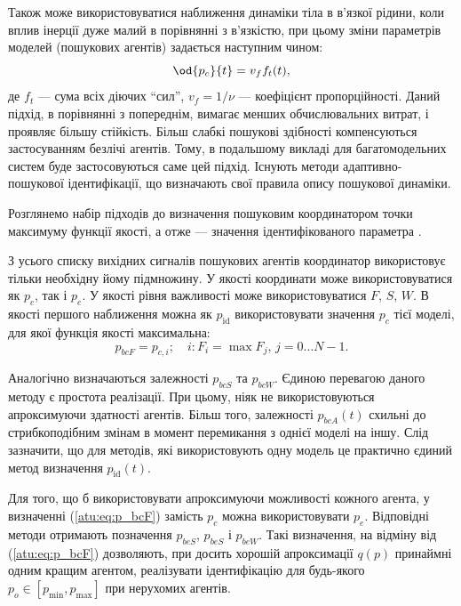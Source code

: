 \documentclass[a4paper,13pt]{atuaref}
\begin{document}
Також може використовуватися наближення динаміки тіла в в'язкої рідини, коли
вплив інерції дуже малий в порівнянні з в'язкістю, при цьому зміни параметрів
моделей (пошукових агентів) задається наступним чином:
%
\begin{equation}
  \od{p_c}{t} = v_f f_t(t),
  \label{atu:eq:v_f}
\end{equation}
%
\noindent
де $ f_t $ --- сума всіх діючих ``сил'',
$ v_f = 1 / \nu $ --- коефіцієнт
пропорційності. Даний підхід, в порівнянні з попереднім, вимагає менших
обчислювальних витрат, і проявляє більшу стійкість. Більш слабкі пошукові
здібності компенсуються застосуванням безлічі агентів. Тому, в подальшому
викладі для багатомодельних систем буде застосовуються саме цей підхід.
Існують методи адаптивно-пошукової ідентифікації, що визначають свої правила опису пошукової динаміки.


Розглянемо набір підходів до визначення пошуковим координатором точки максимуму
функції якості, а отже --- значення ідентифікованого параметра
\cite{atu_st99,atu_jacs2015}.

З усього списку вихідних сигналів пошукових агентів координатор використовує
тільки необхідну йому підмножину. У якості координати може використовуватися як
$ p_c$, так і $ p_e $.
У якості рівня важливості може використовуватися $ F $, $ S $, $W$.
В якості першого наближення можна як $ p_\mathrm{id} $ використовувати
значення $ p_c $ тієї моделі, для якої функція якості максимальна:
%
\begin{equation}
  p_{bcF}
  =
  p_{c,i};
  \quad
  i : F_i = \max{F_j}, \, j=0 \ldots N-1 .
  \label{atu:eq:p_bcF}
\end{equation}

Аналогічно визначаються залежності
$p_{bcS}$ та $p_{bcW}$.
Єдиною перевагою даного методу є простота реалізації. При цьому, ніяк не
використовуються апроксимуючи здатності агентів. Більш того, залежності
$ p_{bcA} (t) $ схильні до стрибкоподібним змінам в момент перемикання з однієї моделі
на іншу. Слід зазначити, що для методів, які використовують одну модель це
практично єдиний метод визначення
$p_\mathrm{id}(t)$.

Для того, що б використовувати апроксимуючи можливості кожного агента, у
визначенні (\ref{atu:eq:p_bcF}) замість $ p_c $ можна використовувати $ p_e$.
Відповідні методи отримають позначення $ p_ {beS} $, $ p_ {beS} $ і $ p_{beW} $.
Такі визначення, на відміну від (\ref{atu:eq:p_bcF}) дозволяють,
при досить хорошій апроксимації $ q (p) $ принаймні одним кращим агентом,
реалізувати ідентифікацію для будь-якого
$ p_o \in [p_{\min} , p_{\max}]$ при нерухомих агентів.
\end{document}
